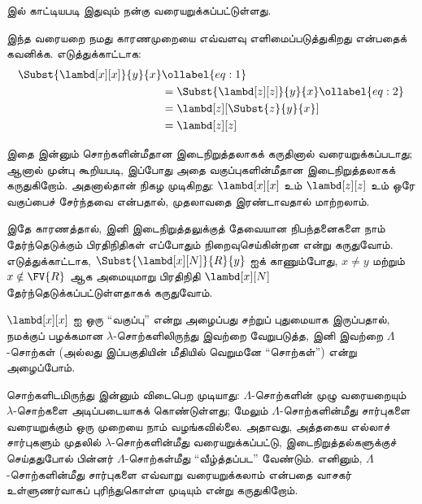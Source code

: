 \documentclass[../../../include/open-logic-section]{subfiles}
\begin{document}
 இல் காட்டியபடி இதுவும் நன்கு வரையறுக்கப்பட்டுள்ளது.

இந்த வரையறை நமது காரணமுறையை எவ்வளவு எளிமைப்படுத்துகிறது என்பதைக் கவனிக்க.
எடுத்துக்காட்டாக:
\begin{align}
  \Subst{\lambd[x][x]}{y}{x} &\ollabel{eq:1}\\
  &= \Subst{\lambd[z][z]}{y}{x} \ollabel{eq:2}\\
  &= \lambd[z][\Subst{z}{y}{x}] \\
  &= \lambd[z][z]
\end{align}

இதை இன்னும் சொற்களின்மீதான இடைநிறுத்தலாகக் கருதினால் 
வரையறுக்கப்படாது; ஆனால் முன்பு கூறியபடி, இப்போது அதை வகுப்புகளின்மீதான
இடைநிறுத்தலாகக் கருதுகிறோம். அதனால்தான்  நிகழ முடிகிறது:
$\lambd[x][x]$ உம் $\lambd[z][z]$ உம் ஒரே வகுப்பைச் சேர்ந்தவை என்பதால்,
முதலாவதை இரண்டாவதால் மாற்றலாம்.

இதே காரணத்தால், இனி இடைநிறுத்தலுக்குத் தேவையான நிபந்தனைகளை நாம் தேர்ந்தெடுக்கும்
பிரதிநிதிகள் எப்போதும் நிறைவுசெய்கின்றன என்று கருதுவோம். எடுத்துக்காட்டாக,
$\Subst{\lambd[x][N]}{R}{y}$ ஐக் காணும்போது, $x \neq y$ மற்றும்
$x \notin \FV{R}$ ஆக அமையுமாறு பிரதிநிதி $\lambd[x][N]$
தேர்ந்தெடுக்கப்பட்டுள்ளதாகக் கருதுவோம்.

$\lambd[x][x]$ ஐ ஒரு ``வகுப்பு'' என்று அழைப்பது சற்றுப் புதுமையாக இருப்பதால்,
நமக்குப் பழக்கமான $\lambda$-சொற்களிலிருந்து இவற்றை வேறுபடுத்த, இனி இவற்றை
$\Lambda$-சொற்கள் (அல்லது இப்பகுதியின் மீதியில் வெறுமனே ``சொற்கள்'') என்று
அழைப்போம்.

\begin{editorial}
  சொற்களிடமிருந்து இன்னும் விடைபெற முடியாது: $\Lambda$-சொற்களின் முழு வரையறையும்
  $\lambda$-சொற்களை அடிப்படையாகக் கொண்டுள்ளது; மேலும் $\Lambda$-சொற்களின்மீது
  சார்புகளை வரையறுக்கும் ஒரு முறையை நாம் வழங்கவில்லை. அதாவது, அத்தகைய எல்லாச்
  சார்புகளும் முதலில் $\lambda$-சொற்களின்மீது வரையறுக்கப்பட்டு, இடைநிறுத்தல்களுக்குச்
  செய்ததுபோல் பின்னர் $\Lambda$-சொற்கள்மீது ``வீழ்த்தப்பட'' வேண்டும். எனினும்,
  $\Lambda$-சொற்களின்மீது சார்புகளை எவ்வாறு வரையறுக்கலாம் என்பதை வாசகர்
  உள்ளுணர்வாகப் புரிந்துகொள்ள முடியும் என்று கருதுகிறோம்.
\end{editorial}
\end{document}
